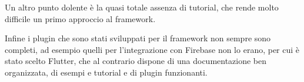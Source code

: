 Un altro punto dolente è la quasi totale assenza di tutorial, che rende molto difficile un primo approccio al framework.

Infine i plugin che sono stati sviluppati per il framework non sempre sono completi, ad esempio quelli per l'integrazione con Firebase non lo erano, per cui è stato scelto Flutter, che al contrario dispone di una documentazione ben organizzata, di esempi e tutorial e di plugin funzionanti.